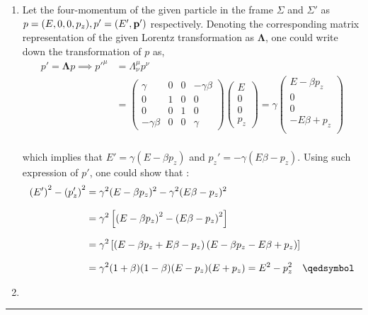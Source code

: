 \begin{solution}
    \begin{enumerate}[label=(\alph*)]   
        \item Let the four-momentum of the given particle in the frame $\Sigma$ and $\Sigma'$ as $p=(E,0,0,p_z),p'=(E',\mathbf{p}')$ respectively. Denoting the corresponding matrix representation of the given Lorentz transformation as $\boldsymbol{\Lambda}$, one could write down the transformation of $p$ as,
        \begin{align*}
            p' = \boldsymbol{\Lambda} p \implies p'^\mu &= \Lambda^{\mu}_\nu p^\nu \\[0.1in]
                   &= \begin{pmatrix}
                    \gamma       & 0 & 0 & -\gamma\beta \\
                    0            & 1 & 0 & 0            \\
                    0            & 0 & 1 & 0            \\
                    -\gamma\beta & 0 & 0 & \gamma      
                   \end{pmatrix}
                   \begin{pmatrix}
                    E \\
                    0 \\
                    0 \\
                    p_z 
                   \end{pmatrix} = \gamma
                   \begin{pmatrix}
                    E-\beta p_z \\ 0 \\ 0 \\ -E\beta +  p_z \\
                   \end{pmatrix} 
        \end{align*}\\
        which implies that $E' = \gamma \left( E-\beta p_z \right)$ and $p_z'=-\gamma(E\beta-p_z)$. Using such expression of $p'$, one could show that : 
        \begin{align*}
            \left(E'\right)^2 - \left(p_z'\right)^2 &= \gamma^2 (E-\beta p_z)^2 - \gamma^2 (E\beta - p_z)^2 \\[0.1in]
                                                    &= \gamma^2 \left[  \left( E-\beta p_z \right)^2 - \left(E\beta - p_z \right)^2 \right] \\[0.1in]
                                                    &= \gamma^2 \left[  \left( E-\beta p_z + E\beta - p_z \right) \left( E-\beta p_z - E\beta + p_z  \right) \right] \\[0.1in]
                                                    &= \gamma^2 (1+\beta)(1-\beta) (E-p_z)(E+p_z) = E^2 - p_z^2 \qed
        \end{align*}
        \item 
    \end{enumerate}
\end{solution} 
\noindent\rule{7in}{1.5pt}

